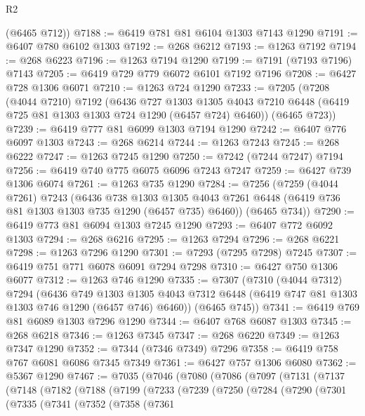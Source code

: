 \begin{lexlean}{R2}
\begin{coremodule}
      (@6465 @712))
@7188 := @6419 @781 @81 @6104 @1303 @7143 @1290
@7191 := @6407 @780 @6102 @1303
@7192 := @268 @6212
@7193 := @1263 @7192
@7194 := @268 @6223
@7196 := @1263 @7194 @1290
@7199 := @7191 (@7193 @7196) @7143
@7205 := @6419 @729 @779 @6072 @6101 @7192 @7196
@7208 := @6427 @728 @1306 @6071
@7210 := @1263 @724 @1290
@7233 := @7205
    (@7208
      (@4044 @7210)
      @7192
      (@6436
        @727
        @1303
        @1305
        @4043
        @7210
        @6448
        (@6419 @725 @81 @1303 @1303 @724 @1290 (@6457 @724) @6460))
      (@6465 @723))
@7239 := @6419 @777 @81 @6099 @1303 @7194 @1290
@7242 := @6407 @776 @6097 @1303
@7243 := @268 @6214
@7244 := @1263 @7243
@7245 := @268 @6222
@7247 := @1263 @7245 @1290
@7250 := @7242 (@7244 @7247) @7194
@7256 := @6419 @740 @775 @6075 @6096 @7243 @7247
@7259 := @6427 @739 @1306 @6074
@7261 := @1263 @735 @1290
@7284 := @7256
    (@7259
      (@4044 @7261)
      @7243
      (@6436
        @738
        @1303
        @1305
        @4043
        @7261
        @6448
        (@6419 @736 @81 @1303 @1303 @735 @1290 (@6457 @735) @6460))
      (@6465 @734))
@7290 := @6419 @773 @81 @6094 @1303 @7245 @1290
@7293 := @6407 @772 @6092 @1303
@7294 := @268 @6216
@7295 := @1263 @7294
@7296 := @268 @6221
@7298 := @1263 @7296 @1290
@7301 := @7293 (@7295 @7298) @7245
@7307 := @6419 @751 @771 @6078 @6091 @7294 @7298
@7310 := @6427 @750 @1306 @6077
@7312 := @1263 @746 @1290
@7335 := @7307
    (@7310
      (@4044 @7312)
      @7294
      (@6436
        @749
        @1303
        @1305
        @4043
        @7312
        @6448
        (@6419 @747 @81 @1303 @1303 @746 @1290 (@6457 @746) @6460))
      (@6465 @745))
@7341 := @6419 @769 @81 @6089 @1303 @7296 @1290
@7344 := @6407 @768 @6087 @1303
@7345 := @268 @6218
@7346 := @1263 @7345
@7347 := @268 @6220
@7349 := @1263 @7347 @1290
@7352 := @7344 (@7346 @7349) @7296
@7358 := @6419 @758 @767 @6081 @6086 @7345 @7349
@7361 := @6427 @757 @1306 @6080
@7362 := @5367 @1290
@7467 := @7035
    (@7046
      (@7080
        (@7086
          (@7097
            (@7131
              (@7137
                (@7148
                  (@7182
                    (@7188
                      (@7199
                        (@7233
                          (@7239
                            (@7250
                              (@7284
                                (@7290
                                  (@7301
                                    (@7335
                                      (@7341
                                        (@7352
                                          (@7358
                                            (@7361

\end{coremodule}
\end{lexlean}
